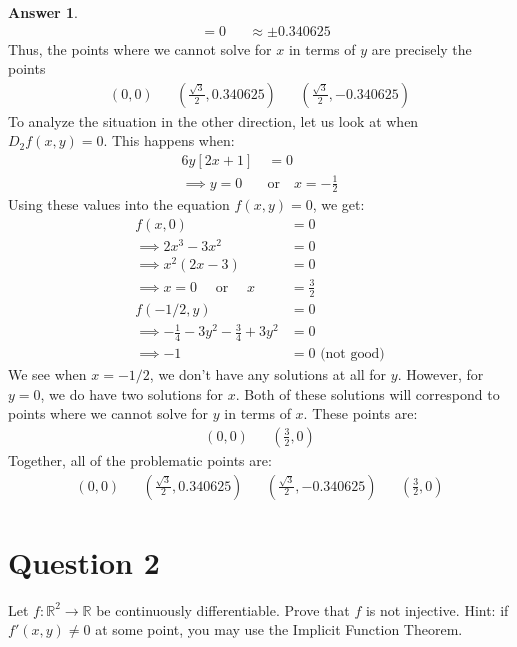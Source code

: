 \documentclass[10pt,a4paper]{article}
\theoremstyle{definition}
\newtheorem*{answer*}{Answer}
\theoremstyle{definition}
\numberwithin{equation}{section}
\begin{document}
\begin{answer*}
\begin{align*}
&= 0 & &\approx \pm 0.340625
\end{align*}
Thus, the points where we cannot solve for $x$ in terms of $y$ are precisely the points 
\begin{align*}
(0, 0) && \left(\frac{\sqrt{3}}{2}, 0.340625\right) && \left(\frac{\sqrt{3}}{2}, -0.340625\right)
\end{align*}
To analyze the situation in the other direction, let us look at when $D_2f(x, y) = 0$. This happens when:
\begin{align*}
6y[2x + 1] &= 0\\
\implies y = 0 \quad &\text{or} \quad x = -\frac{1}{2}
\end{align*}
Using these values into the equation $f(x, y) = 0$, we get:
\begin{align*}
f(x, 0) &= 0\\
\implies 2x^3 - 3x^2 &= 0\\
\implies x^2(2x - 3) &= 0\\
\implies x = 0 \quad \text{ or } \quad  x &= \frac{3}{2}\\
f(-1/2, y) &= 0\\
\implies -\frac{1}{4} - 3y^2 - \frac{3}{4} + 3y^2 &= 0\\
\implies -1 &= 0 \text{ (not good)}
\end{align*}
We see when $x = -1/2$, we don't have any solutions at all for $y$. However, for $y = 0$, we do have two solutions for $x$. Both of these solutions will correspond to points where we cannot solve for $y$ in terms of $x$. These points are:
\begin{align*}
(0,0) && \left(\frac{3}{2}, 0\right)
\end{align*}
Together, all of the problematic points are:
\begin{align*}
(0,0) && \left(\frac{\sqrt{3}}{2}, 0.340625\right) && \left(\frac{\sqrt{3}}{2}, -0.340625\right) && \left(\frac{3}{2}, 0\right)
\end{align*}
\end{answer*}


\section*{Question 2}
Let $f: \mathbb{R}^2 \to \mathbb{R}$ be continuously differentiable. Prove that $f$ is not injective. Hint: if $f'(x, y) \neq 0$ at some point, you may use the Implicit Function Theorem.
\end{document}
